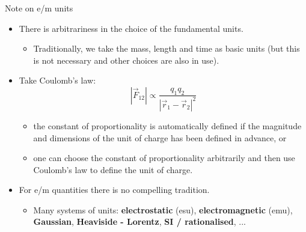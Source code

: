 \begin{frame}{Note on e/m units}

\begin{itemize}
\item
  There is arbitrariness in the choice of the fundamental units.
  \begin{itemize}
   \item
     Traditionally, we take the mass, length and time as basic units (but this is not necessary and other choices are also in use).
  \end{itemize}
\vspace{0.2cm}
\item
   Take Coulomb's law:
   \begin{equation*}
        |\vec{F}_{12}| \propto \frac{q_1 q_2}{|\vec{r}_{1}-\vec{r}_{2}|^{2}}
    \end{equation*}
    \begin{itemize}
      \item
        the constant of proportionality is automatically defined if the magnitude and dimensions of the unit of charge has been defined in advance, or
       \item
        one can choose the constant of proportionality arbitrarily and then use Coulomb's law to define the unit of charge.
    \end{itemize}
\vspace{0.2cm}
\item
  For e/m quantities there is no compelling tradition.
  \begin{itemize}
   \item
    Many systems of units:
    {\bf electrostatic} (esu), {\bf electromagnetic} (emu),
    {\bf Gaussian}, {\bf Heaviside - Lorentz}, {\bf SI / rationalised}, ...
   \end{itemize}
\end{itemize}

\end{frame}

%
%
%

